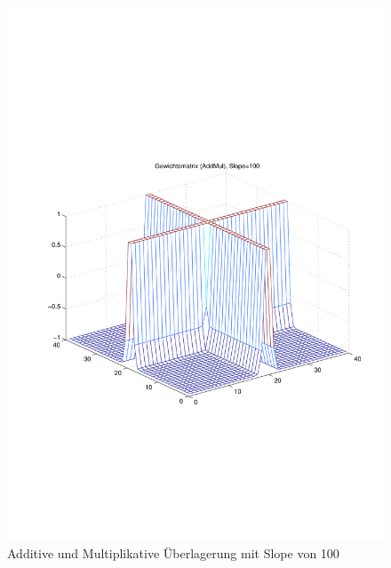 \begin{figure}[hbt]
	\centering
	\includegraphics[trim=70 200 32 242, clip, width=0.45\linewidth]{./Bilder/Auswertung/Gewichtsmatrix/Gewichtsmatrix_AddMul_Slope_100}
	\caption{Additive und Multiplikative Überlagerung mit Slope von 100}
	\label{AddMul100}
\end{figure}

\newpage
